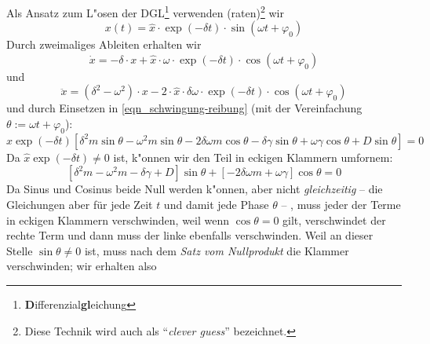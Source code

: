 Als Ansatz zum L"osen der
DGL\footnote{\textbf{D}ifferenzial\textbf{gl}eichung} verwenden
(raten)\footnote{Diese Technik wird auch als "`\emph{clever guess}"'
  bezeichnet.} wir
\begin{equation}
   \label{eq:106}
   \boxed{x(t) = \hat x \cdot \exp(-\delta t) \cdot \sin(\omega t + \varphi_0)}
\end{equation}
Durch zweimaliges Ableiten erhalten wir
\begin{equation}
   \label{eq:108}
   \dot x = - \delta \cdot x + \hat x \cdot \omega \cdot \exp(-\delta t) \cdot \cos(\omega t + \varphi_0)
\end{equation}
und 
\begin{equation}
   \label{eq:110}
   \ddot x = (\delta^2 - \omega^2 )\cdot x - 2 \cdot \hat x \cdot \delta \omega \cdot
   \exp(-\delta t) \cdot \cos(\omega t + \varphi_0) 
\end{equation}
und durch Einsetzen in \eqref{eqn_schwingung-reibung} (mit der
Vereinfachung $\theta := \omega t + \varphi_0$):
\begin{equation}
   \label{eq:109}
   \hat x \exp(-\delta t) 
\left [
\delta^2 m \sin\theta - \omega^2 m \sin\theta - 2 \delta \omega m\cos\theta
-
\delta \gamma  \sin\theta + \omega \gamma 
\cos\theta
+
D \sin\theta
 \right ] = 0
\end{equation}
Da $\hat x \exp(-\delta t) \neq 0$ ist, k"onnen wir den Teil in eckigen
Klammern umfornem:
\begin{equation}
   \label{eq:111}
 [ \delta^2m - \omega^2m - \delta \gamma + D ] \sin\theta + [-2\delta\omega m +
 \omega \gamma] \cos\theta = 0
\end{equation}
Da Sinus und Cosinus beide Null werden k"onnen, aber nicht
\emph{gleichzeitig} -- die Gleichungen aber für jede Zeit $t$ und
damit jede Phase $\theta$ -- , muss jeder der Terme in eckigen
Klammern verschwinden, weil wenn $\cos\theta = 0$ gilt, verschwindet
der rechte Term und dann muss der linke ebenfalls verschwinden. Weil
an dieser Stelle $\sin\theta \neq 0$ ist, muss nach dem \emph{Satz vom
  Nullprodukt} die Klammer verschwinden; wir erhalten also
